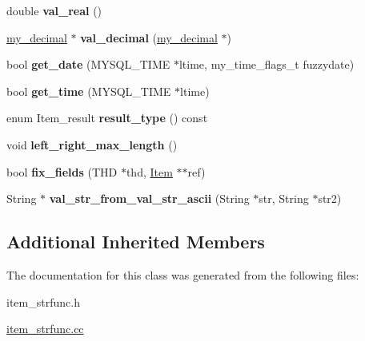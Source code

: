 \begin{DoxyCompactItemize}
\item 
\mbox{\label{classItem__str__func_abd039d5ed423c454eae7bd3507067a69}} 
double {\bfseries val\+\_\+real} ()
\item 
\mbox{\label{classItem__str__func_ab45db579f83f7184e76f4545898fe260}} 
\mbox{\hyperlink{classmy__decimal}{my\+\_\+decimal}} $\ast$ {\bfseries val\+\_\+decimal} (\mbox{\hyperlink{classmy__decimal}{my\+\_\+decimal}} $\ast$)
\item 
\mbox{\label{classItem__str__func_af1ef39b2098032166a0a46000988d7e3}} 
bool {\bfseries get\+\_\+date} (M\+Y\+S\+Q\+L\+\_\+\+T\+I\+ME $\ast$ltime, my\+\_\+time\+\_\+flags\+\_\+t fuzzydate)
\item 
\mbox{\label{classItem__str__func_ac4948b8f44ceb4025ea28d5c9a4fdf5d}} 
bool {\bfseries get\+\_\+time} (M\+Y\+S\+Q\+L\+\_\+\+T\+I\+ME $\ast$ltime)
\item 
\mbox{\label{classItem__str__func_a3d82c01ccbcc4dcf5b7390e4c5d6d17f}} 
enum Item\+\_\+result {\bfseries result\+\_\+type} () const
\item 
\mbox{\label{classItem__str__func_a02ad544206d84a77d08a5e1ab258f565}} 
void {\bfseries left\+\_\+right\+\_\+max\+\_\+length} ()
\item 
\mbox{\label{classItem__str__func_a2fb5f3206c59b061353202d09d06e3e3}} 
bool {\bfseries fix\+\_\+fields} (T\+HD $\ast$thd, \mbox{\hyperlink{classItem}{Item}} $\ast$$\ast$ref)
\item 
\mbox{\label{classItem__str__func_a03be2fcd87cbd1088ab14ac98cdbaf8e}} 
String $\ast$ {\bfseries val\+\_\+str\+\_\+from\+\_\+val\+\_\+str\+\_\+ascii} (String $\ast$str, String $\ast$str2)
\end{DoxyCompactItemize}
\subsection*{Additional Inherited Members}


The documentation for this class was generated from the following files\+:\begin{DoxyCompactItemize}
\item 
item\+\_\+strfunc.\+h\item 
\mbox{\hyperlink{item__strfunc_8cc}{item\+\_\+strfunc.\+cc}}\end{DoxyCompactItemize}
